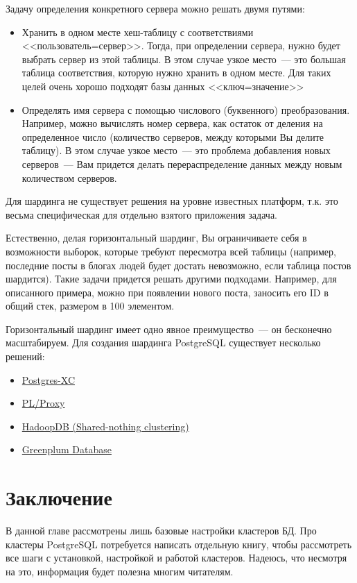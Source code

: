 Задачу определения конкретного сервера можно решать двумя путями:
\begin{itemize}
\item Хранить в одном месте хеш-таблицу с соответствиями <<пользователь=сервер>>. Тогда, при определении сервера, нужно будет
выбрать сервер из этой таблицы. В этом случае узкое место~--- это большая таблица соответствия, которую нужно хранить в одном месте.
Для таких целей очень хорошо подходят базы данных <<ключ=значение>>
\item Определять имя сервера с помощью числового (буквенного) преобразования. Например, можно вычислять номер сервера,
как остаток от деления на определенное число (количество серверов, между которыми Вы делите таблицу). В этом случае узкое место~---
это проблема добавления новых серверов~--- Вам придется делать перераспределение данных между новым количеством серверов.
\end{itemize}

Для шардинга не существует решения на уровне известных платформ, т.к. это весьма специфическая для отдельно взятого приложения задача.

Естественно, делая горизонтальный шардинг, Вы ограничиваете себя в возможности выборок, которые требуют
пересмотра всей таблицы (например, последние посты в блогах людей будет достать невозможно, если таблица постов шардится).
Такие задачи придется решать другими подходами. Например, для описанного примера, можно при появлении нового поста, заносить
его ID в общий стек, размером в 100 элементом.

Горизонтальный шардинг имеет одно явное преимущество~--- он бесконечно масштабируем.
Для создания шардинга PostgreSQL существует несколько решений:
\begin{itemize}
\item \href{http://postgres-xc.sourceforge.net/}{Postgres-XC}
\item \href{http://plproxy.projects.postgresql.org/doc/tutorial.html}{PL/Proxy}
\item \href{http://db.cs.yale.edu/hadoopdb/hadoopdb.html}{HadoopDB (Shared-nothing clustering)}
\item \href{http://www.greenplum.com/products/greenplum-database}{Greenplum Database}
\end{itemize}







\section{Заключение}
В данной главе рассмотрены лишь базовые настройки кластеров БД.
Про кластеры PostgreSQL потребуется написать отдельную книгу, чтобы рассмотреть все шаги с установкой, настройкой и работой кластеров.
Надеюсь, что несмотря на это, информация будет полезна многим читателям.